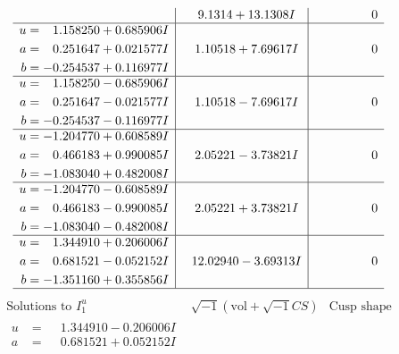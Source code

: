 \documentclass[1p]{elsarticle_modified}
\theoremstyle{definition}
\newcommand{\I}{\sqrt{-1}}
\begin{document}
$$\begin{array}{c|c|c}
 & \phantom{-}9.1314 + 13.1308 I & \phantom{-0.000000 } 0 \\ \hline\begin{aligned}
u &= \phantom{-}1.158250 + 0.685906 I \\
a &= \phantom{-}0.251647 + 0.021577 I \\
b &= -0.254537 + 0.116977 I\end{aligned}
 & \phantom{-}1.10518 + 7.69617 I & \phantom{-0.000000 } 0 \\ \hline\begin{aligned}
u &= \phantom{-}1.158250 - 0.685906 I \\
a &= \phantom{-}0.251647 - 0.021577 I \\
b &= -0.254537 - 0.116977 I\end{aligned}
 & \phantom{-}1.10518 - 7.69617 I & \phantom{-0.000000 } 0 \\ \hline\begin{aligned}
u &= -1.204770 + 0.608589 I \\
a &= \phantom{-}0.466183 + 0.990085 I \\
b &= -1.083040 + 0.482008 I\end{aligned}
 & \phantom{-}2.05221 - 3.73821 I & \phantom{-0.000000 } 0 \\ \hline\begin{aligned}
u &= -1.204770 - 0.608589 I \\
a &= \phantom{-}0.466183 - 0.990085 I \\
b &= -1.083040 - 0.482008 I\end{aligned}
 & \phantom{-}2.05221 + 3.73821 I & \phantom{-0.000000 } 0 \\ \hline\begin{aligned}
u &= \phantom{-}1.344910 + 0.206006 I \\
a &= \phantom{-}0.681521 - 0.052152 I \\
b &= -1.351160 + 0.355856 I\end{aligned}
 & \phantom{-}12.02940 - 3.69313 I & \phantom{-0.000000 } 0\\
 \hline 
 \end{array}$$\newpage$$\begin{array}{c|c|c}  
\text{Solutions to }I^u_{1}& \I (\text{vol} + \sqrt{-1}CS) & \text{Cusp shape}\\
 \hline 
\begin{aligned}
u &= \phantom{-}1.344910 - 0.206006 I \\
a &= \phantom{-}0.681521 + 0.052152 I \\

\end{aligned}
\end{array}$$
\end{document}
